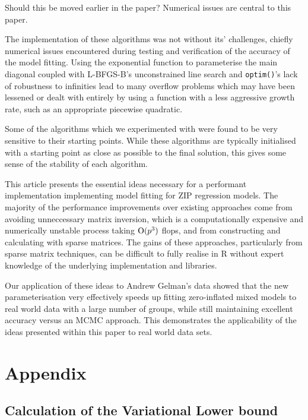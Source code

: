 \documentclass[times, doublespace]{anzsauth}
\newcommand{\mgc}[1]{{\color{blue}#1}}
\begin{document}
	\mgc{Should this be moved earlier in the paper? Numerical issues are central to this paper.}
	
	\noindent The implementation of these algorithms was not without its' challenges, chiefly numerical issues encountered during testing and verification of the accuracy of the model fitting. Using the exponential function to parameterise the main diagonal coupled with L-BFGS-B's unconstrained line search and \texttt{optim()}'s lack of robustness to infinities lead to many overflow problems which may have been lessened or dealt with entirely by using a function with a less aggressive growth rate, such as an appropriate piecewise quadratic.
		
	\noindent Some of the algorithms which we experimented with were found to be very sensitive to their starting points.
	While these algorithms are typically initialised with a starting point as close as possible to the final
	solution, this gives some sense of the stability of each algorithm.
		
	\noindent This article presents the essential ideas necessary for a performant implementation implementing model fitting
	for ZIP regression models.%
	The majority of the performance
	improvements over existing approaches come from avoiding unneccessary matrix inversion, which is a
	computationally expensive and numerically unstable process taking $\text{O}(p^3)$ flops, and from constructing and 
	calculating	with sparse matrices. The gains of these approaches, particularly from sparse matrix techniques, 
	can be difficult to fully realise in R without expert knowledge of the underlying implementation and libraries.
		
	\noindent Our application of these ideas to Andrew Gelman's data showed that the new parameterisation very effectively
	speeds up fitting zero-inflated mixed models to real world data with a large number of groups, while still
	maintaining excellent accuracy versus an MCMC approach. This demonstrates the applicability of the ideas
	presented within this paper to real world data sets.
		
	\newpage
	\section{Appendix} 
	\subsection{Calculation of the Variational Lower bound}
		
\end{document}
